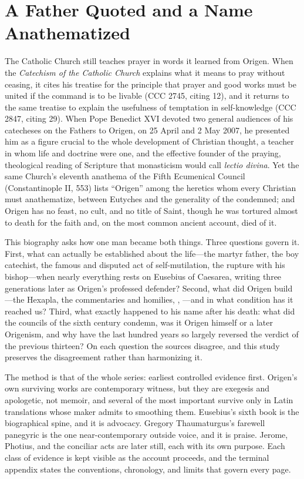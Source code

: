 \section{A Father Quoted and a Name Anathematized}

The Catholic Church still teaches prayer in words it learned from Origen. When
the \textit{Catechism of the Catholic Church} explains what it means to pray
without ceasing, it cites his treatise  for the principle that
prayer and good works must be united if the command is to be livable (CCC 2745,
citing  12), and it returns to the same treatise to explain
the usefulness of temptation in self-knowledge (CCC 2847, citing  29). When Pope Benedict XVI devoted two general audiences of his
catecheses on the Fathers to Origen, on 25 April and 2 May 2007, he presented
him as a figure crucial to the whole development of Christian thought, a
teacher in whom life and doctrine were one, and the effective founder of the
praying, theological reading of Scripture that monasticism would call
\textit{lectio divina}. Yet the same Church's eleventh anathema of the Fifth
Ecumenical Council (Constantinople II, 553) lists ``Origen'' among the
heretics whom every Christian must anathematize, between Eutyches and the
generality of the condemned; and Origen has no feast, no cult, and no title of
Saint, though he was tortured almost to death for the faith and, on the most
common ancient account, died of it.

This biography asks how one man became both things. Three questions govern it.
First, what can actually be established about the life---the martyr father,
the boy catechist, the famous and disputed act of self-mutilation, the rupture
with his bishop---when nearly everything rests on Eusebius of Caesarea,
writing three generations later as Origen's professed defender? Second, what
did Origen build---the Hexapla, the commentaries and homilies, , ---and in what condition has it reached us?
Third, what exactly happened to his name after his death: what did the
councils of the sixth century condemn, was it Origen himself or a later
Origenism, and why have the last hundred years so largely reversed the
verdict of the previous thirteen? On each question the sources disagree, and
this study preserves the disagreement rather than harmonizing it.

The method is that of the whole series: earliest controlled evidence first.
Origen's own surviving works are contemporary witness, but they are exegesis
and apologetic, not memoir, and several of the most important survive only in
Latin translations whose maker admits to smoothing them. Eusebius's sixth book
is the biographical spine, and it is advocacy. Gregory Thaumaturgus's farewell
panegyric is the one near-contemporary outside voice, and it is praise.
Jerome, Photius, and the conciliar acts are later still, each with its own
purpose. Each class of evidence is kept visible as the account proceeds, and
the terminal appendix states the conventions, chronology, and limits that
govern every page.
